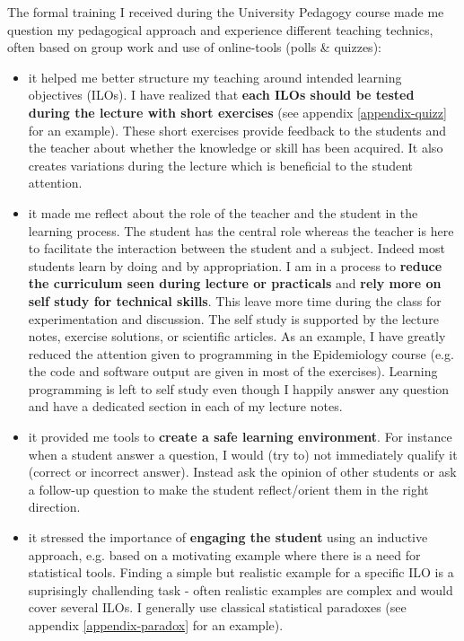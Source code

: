 \documentclass[12pt]{article}
\begin{document}
The formal training I received during the University Pedagogy course
made me question my pedagogical approach and experience different
teaching technics, often based on group work and use of online-tools
(polls \& quizzes):
\begin{itemize}
\item it helped me better structure my teaching around intended learning
objectives (ILOs). I have realized that \textbf{each ILOs should be tested
during the lecture with short exercises} (see appendix
\ref{appendix-quizz} for an example). These short exercises provide
feedback to the students and the teacher about whether the knowledge
or skill has been acquired. It also creates variations during the
lecture which is beneficial to the student attention.

\item it made me reflect about the role of the teacher and the student in
the learning process. The student has the central role whereas the
teacher is here to facilitate the interaction between the student
and a subject. Indeed most students learn by doing and by
appropriation. I am in a process to \textbf{reduce the curriculum seen
during lecture or practicals} and \textbf{rely more on self study for
technical skills}. This leave more time during the class for
experimentation and discussion. The self study is supported by the
lecture notes, exercise solutions, or scientific articles. \newline
As an example, I have greatly reduced the attention given to
programming in the Epidemiology course (e.g. the code and software
output are given in most of the exercises). Learning programming is
left to self study even though I happily answer any question and
have a dedicated section in each of my lecture notes.

\item it provided me tools to \textbf{create a safe learning environment}. For
instance when a student answer a question, I would (try to) not
immediately qualify it (correct or incorrect answer). Instead ask the
opinion of other students or ask a follow-up question to make the
student reflect/orient them in the right direction.

\item it stressed the importance of \textbf{engaging the student} using an
inductive approach, e.g. based on a motivating example where there
is a need for statistical tools. Finding a simple but realistic
example for a specific ILO is a suprisingly challending task - often
realistic examples are complex and would cover several ILOs. I
generally use classical statistical paradoxes (see appendix
\ref{appendix-paradox} for an example).
\end{itemize}
\end{document}
